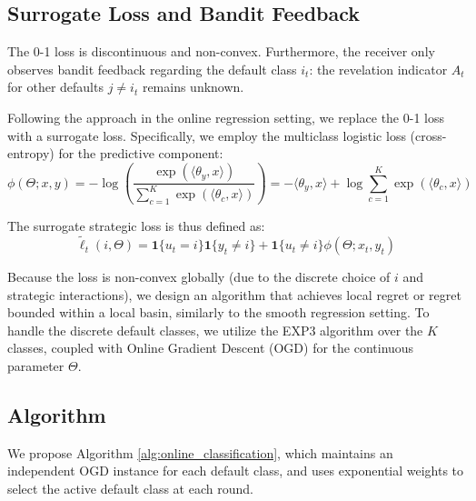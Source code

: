 \documentclass[11pt]{article}
\begin{document}
\subsection{Surrogate Loss and Bandit Feedback}

The 0-1 loss is discontinuous and non-convex. Furthermore, the receiver only observes bandit feedback regarding the default class $i_t$: the revelation indicator $A_t$ for other defaults $j \neq i_t$ remains unknown.

Following the approach in the online regression setting, we replace the 0-1 loss with a surrogate loss. Specifically, we employ the multiclass logistic loss (cross-entropy) for the predictive component:
\begin{equation}
    \phi(\Theta; x, y) = -\log \left( \frac{\exp(\langle \theta_y, x \rangle)}{\sum_{c=1}^K \exp(\langle \theta_c, x \rangle)} \right) = - \langle \theta_y, x \rangle + \log \sum_{c=1}^K \exp(\langle \theta_c, x \rangle)
\end{equation}

The surrogate strategic loss is thus defined as:
\begin{equation}
    \tilde{\ell}_t(i, \Theta) = \mathbf{1}\{u_t = i\}\mathbf{1}\{y_t \neq i\} + \mathbf{1}\{u_t \neq i\} \phi(\Theta; x_t, y_t)
\end{equation}

Because the loss is non-convex globally (due to the discrete choice of $i$ and strategic interactions), we design an algorithm that achieves local regret or regret bounded within a local basin, similarly to the smooth regression setting. To handle the discrete default classes, we utilize the EXP3 algorithm over the $K$ classes, coupled with Online Gradient Descent (OGD) for the continuous parameter $\Theta$.

\subsection{Algorithm}

We propose Algorithm \ref{alg:online_classification}, which maintains an independent OGD instance for each default class, and uses exponential weights to select the active default class at each round.
\end{document}
